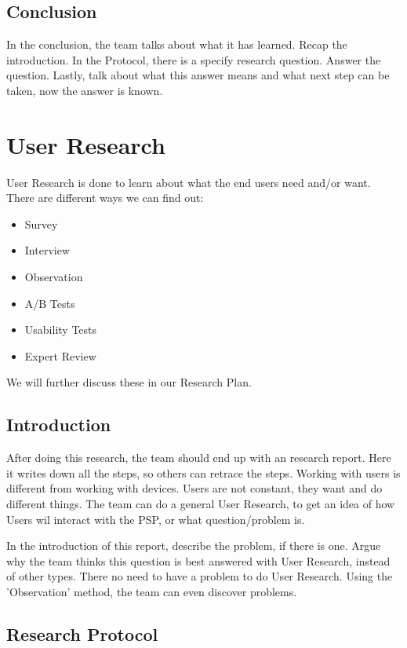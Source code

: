 \documentclass[10pt]{report}
\begin{document}
\subsection{Conclusion}

In the conclusion, the team talks about what it has learned. Recap the introduction. In the Protocol, there is a specify research question. Answer the question. Lastly, talk about what this answer means and what next step can be taken, now the answer is known.

\newpage

\section{User Research}

User Research is done to learn about what the end users need and/or want. There are different ways we can find out:

\begin{itemize}
	\item Survey
	\item Interview
	\item Observation
	\item A/B Tests
	\item Usability Tests
	\item Expert Review
\end{itemize}

We will further discuss these in our Research Plan.

\subsection{Introduction}

After doing this research, the team should end up with an research report. Here it writes down all the steps, so others can retrace the steps. Working with users is different from working with devices. Users are not constant, they want and do different things. The team can do a general User Research, to get an idea of how Users wil interact with the PSP, or what question/problem is.

In the introduction of this report, describe the problem, if there is one. Argue why the team thinks this question is best answered with User Research, instead of other types. There no need to have a problem to do User Research. Using the 'Observation' method, the team can even discover problems.

\subsection{Research Protocol}
\end{document}

